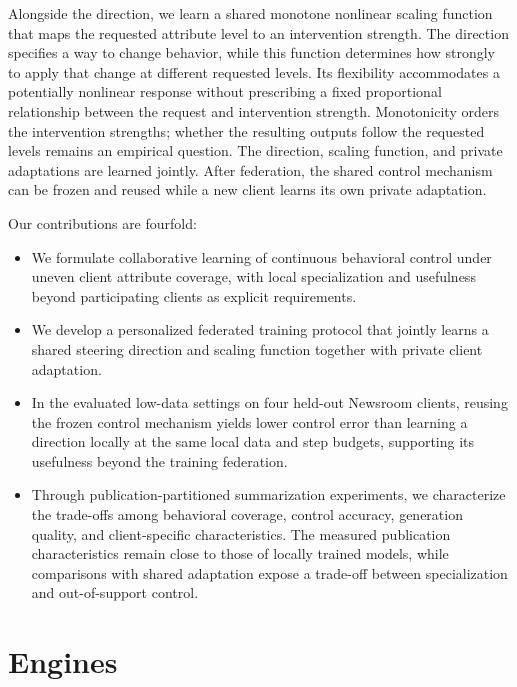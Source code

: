 \documentclass[11pt]{article}
\begin{document}
Alongside the direction, we learn a shared monotone nonlinear scaling function that maps the requested attribute level to an intervention strength.
The direction specifies a way to change behavior, while this function determines how strongly to apply that change at different requested levels.
Its flexibility accommodates a potentially nonlinear response without prescribing a fixed proportional relationship between the request and intervention strength.
Monotonicity orders the intervention strengths; whether the resulting outputs follow the requested levels remains an empirical question.
The direction, scaling function, and private adaptations are learned jointly.
After federation, the shared control mechanism can be frozen and reused while a new client learns its own private adaptation.

Our contributions are fourfold:
\begin{itemize}
    \item We formulate collaborative learning of continuous behavioral control under uneven client attribute coverage, with local specialization and usefulness beyond participating clients as explicit requirements.
    \item We develop a personalized federated training protocol that jointly learns a shared steering direction and scaling function together with private client adaptation.
    \item In the evaluated low-data settings on four held-out Newsroom clients, reusing the frozen control mechanism yields lower control error than learning a direction locally at the same local data and step budgets, supporting its usefulness beyond the training federation.
    \item Through publication-partitioned summarization experiments, we characterize the trade-offs among behavioral coverage, control accuracy, generation quality, and client-specific characteristics. The measured publication characteristics remain close to those of locally trained models, while comparisons with shared adaptation expose a trade-off between specialization and out-of-support control.
\end{itemize}

\section{Engines}
\end{document}

